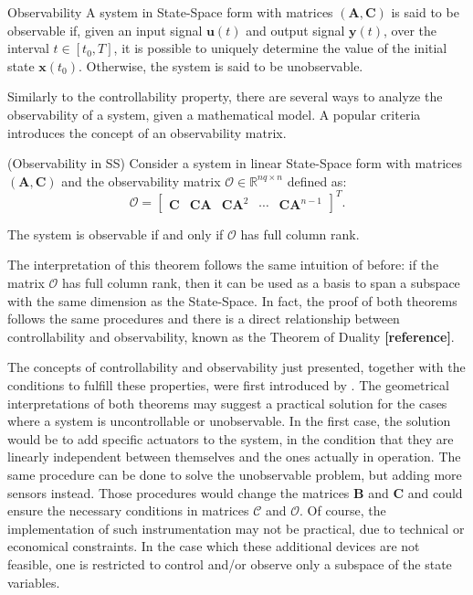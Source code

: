 \documentclass[a4paper,11pt]{book}
\numberwithin{figure}{chapter}
\numberwithin{equation}{chapter}
\numberwithin{table}{chapter}
\newtheorem{theorem}{Theorem}[chapter]
\theoremstyle{definition}
\newtheorem{definition}{Definition}[chapter]
\newcounter{boxed-theorem}
\newenvironment{boxed-theorem}[1]
{\colorlet{shadecolor}{pastelBlue2!10} \begin{shaded} \begin{theorem}{#1}}
{\end{theorem} \end{shaded}}
\newcounter{boxed-definition}
\newenvironment{boxed-definition}[1]
{\colorlet{shadecolor}{pastelYellow!15} \begin{shaded} \begin{definition}{#1}}
{\end{definition} \end{shaded}}
\newcounter{boxed-example}
\begin{document}
\begin{boxed-definition}{Observability}
    A system in State-Space form with matrices $(\bm{A}, \bm{C})$ is said to be observable if, given an input signal $\bm{u}(t)$ and output signal $\bm{y}(t)$, over the interval $t \in [t_0, T]$, it is possible to uniquely determine the value of the initial state $\bm{x}(t_0)$. Otherwise, the system is said to be unobservable.
\end{boxed-definition}

Similarly to the controllability property, there are several ways to analyze the observability of a system, given a mathematical model. A popular criteria introduces the concept of an observability matrix.

\begin{boxed-theorem}{(Observability in SS)}
    Consider a system in linear State-Space form with matrices $(\bm{A}, \bm{C})$ and the observability matrix $\bm{\mathcal{O}} \in \mathbb{R}^{nq \times n}$ defined as:
    \begin{equation}
        \bm{\mathcal{O}} = \begin{bmatrix} \bm{C} & \bm{C} \bm{A} & \bm{C} \bm{A}^2 & \cdots & \bm{C} \bm{A}^{n-1} \end{bmatrix}^T
    .\end{equation}
    
    The system is observable if and only if $\bm{\mathcal{O}}$ has full column rank.
\end{boxed-theorem}   

The interpretation of this theorem follows the same intuition of before: if the matrix $\bm{\mathcal{O}}$ has full column rank, then it can be used as a basis to span a subspace with the same dimension as the State-Space. In fact, the proof of both theorems follows the same procedures and there is a direct relationship between controllability and observability, known as the Theorem of Duality \textbf{[reference]}.

The concepts of controllability and observability just presented, together with the conditions to fulfill these properties, were first introduced by \cite{Kalman:1960}. The geometrical interpretations of both theorems may suggest a practical solution for the cases where a system is uncontrollable or unobservable. In the first case, the solution would be to add specific actuators to the system, in the condition that they are linearly independent between themselves and the ones actually in operation. The same procedure can be done to solve the unobservable problem, but adding more sensors instead. Those procedures would change the matrices $\bm{B}$ and $\bm{C}$ and could ensure the necessary conditions in matrices $\bm{\mathcal{C}}$ and $\bm{\mathcal{O}}$. Of course, the implementation of such instrumentation may not be practical, due to technical or economical constraints. In the case which these additional devices are not feasible, one is restricted to control and/or observe only a subspace of the state variables.
\end{document}
